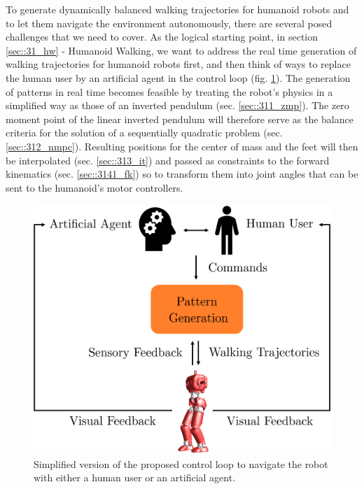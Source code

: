 To generate dynamically balanced walking trajectories for humanoid robots and to let them navigate the environment autonomously, there are several posed challenges that we need to cover. As the logical starting point, in section \ref{sec::31_hw} - Humanoid Walking, we want to address the real time generation of walking trajectories for humanoid robots first, and then think of ways to replace the human user by an artificial agent in the control loop (fig. \ref{fig::3_cl}). The generation of patterns in real time becomes feasible by treating the robot's physics in a simplified way as those of an inverted pendulum (sec. \ref{sec::311_zmp}). The zero moment point of the linear inverted pendulum will therefore serve as the balance criteria for the solution of a sequentially quadratic problem (sec. \ref{sec::312_nmpc}).  Resulting positions for the center of mass and the feet will then be interpolated (sec. \ref{sec::313_it}) and passed as constraints to the forward kinematics (sec. \ref{sec::3141_fk}) so to transform them into joint angles that can be sent to the humanoid's motor controllers.
\begin{figure}[h]
	\centering
	\includegraphics[scale=.5]{chapters/03_background/img/control_loop.png}
	\caption{Simplified version of the proposed control loop to navigate the robot with either a human user or an artificial agent.}
	\label{fig::3_cl}
\end{figure}
\\
